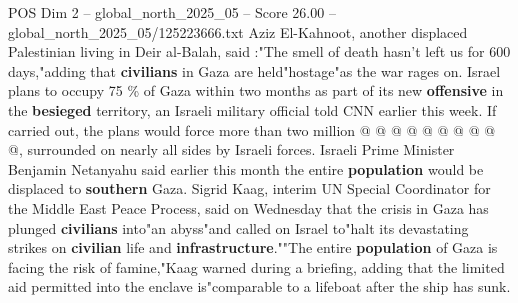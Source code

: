 \begin{textsample}{POS Dim 2 – global\_north\_2025\_05 – Score 26.00 – global\_north\_2025\_05/125223666.txt}
Aziz El-Kahnoot, another displaced Palestinian living in Deir al-Balah, said :"The smell of death hasn't left us for 600 days,"adding that \textbf{civilians} in Gaza are held"hostage"as the war rages on.
Israel plans to occupy 75 \% of Gaza within two months as part of its new \textbf{offensive} in the \textbf{besieged} territory, an Israeli military official told CNN earlier this week.
If carried out, the plans would force more than two million @ @ @ @ @ @ @ @ @ @, surrounded on nearly all sides by Israeli forces.
Israeli Prime Minister Benjamin Netanyahu said earlier this month the entire \textbf{population} would be displaced to \textbf{southern} Gaza.
Sigrid Kaag, interim UN Special Coordinator for the Middle East Peace Process, said on Wednesday that the crisis in Gaza has plunged \textbf{civilians} into"an abyss"and called on Israel to"halt its devastating strikes on \textbf{civilian} life and \textbf{infrastructure}.""The entire \textbf{population} of Gaza is facing the risk of famine,"Kaag warned during a briefing, adding that the limited aid permitted into the enclave is"comparable to a lifeboat after the ship has sunk.

\end{textsample}
